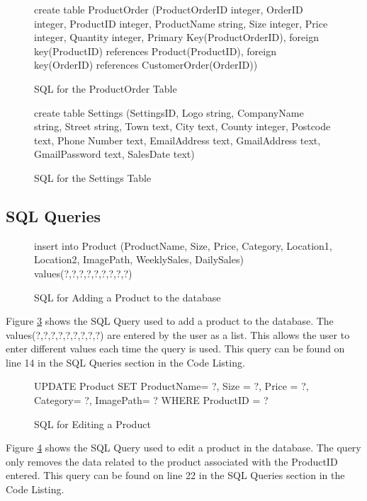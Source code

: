 \begin{figure}[H]
	 \caption{SQL for the ProductOrder Table} \label{fig:product-order-sql}
	\begin{sql}
	create table ProductOrder
            (ProductOrderID integer,
            OrderID integer,
            ProductID integer,
            ProductName string,
            Size integer,
            Price integer,
            Quantity integer,
            Primary Key(ProductOrderID),
            foreign key(ProductID) references Product(ProductID),
            foreign key(OrderID) references CustomerOrder(OrderID))
	\end{sql}
\end{figure}

\begin{figure}[H]
	 \caption{SQL for the Settings Table} \label{fig:settings-sql}
	\begin{sql}
	create table Settings
              (SettingsID,
              Logo string,
              CompanyName string,
              Street string,
              Town text,
              City text,
              County integer,
              Postcode text,
              Phone Number text,
              EmailAddress text,
              GmailAddress text,
              GmailPassword text,
              SalesDate text)
	\end{sql}
\end{figure}

\pagebreak
\subsection{SQL Queries}

\begin{figure}[H]
 \caption{SQL for Adding a Product to the database} \label{fig:add-product-sql}
	\begin{sql}
insert into Product (ProductName, Size, Price, Category, Location1, Location2, ImagePath, WeeklySales, DailySales) values(?,?,?,?,?,?,?,?,?)
	\end{sql}
\end{figure}

Figure \ref{fig:add-product-sql} shows the SQL Query used to add a product to the database. The values(?,?,?,?,?,?,?,?,?) are entered by the user as a list. This allows the user to enter different values each time the query is used. This query can be found on line 14 in the SQL Queries section in the Code Listing.

\begin{figure}[H]
	 \caption{SQL for Editing a Product} \label{fig:edit-product-sql}
\begin{sql} 
UPDATE Product SET ProductName= ?,  Size = ?,  Price = ?, Category= ?, ImagePath= ? WHERE ProductID = ?
 \end{sql}
\end{figure}
Figure \ref{fig:edit-product-sql} shows the SQL Query used to edit a product in the database. The query only removes the data related to the product associated with the ProductID entered. This query can be found on line 22 in the SQL Queries section in the Code Listing.


